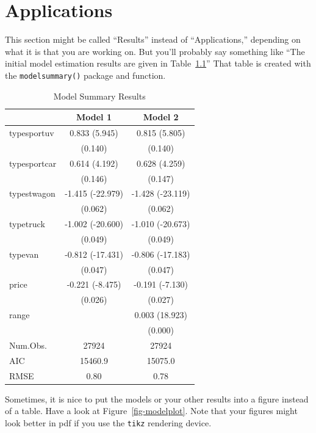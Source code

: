 \documentclass[
  letterpaper,
  DIV=11,
  numbers=noendperiod]{scrreprt}
\begin{document}

\hypertarget{applications}{%
\chapter{Applications}\label{applications}}

This section might be called ``Results'' instead of ``Applications,''
depending on what it is that you are working on. But you'll probably say
something like ``The initial model estimation results are given in
Table~\ref{tbl-estimationresults}'' That table is created with the
\texttt{modelsummary()} package and function.

\hypertarget{tbl-estimationresults}{}
\begin{table}
\caption{\label{tbl-estimationresults}Model Summary Results }\tabularnewline

\centering
\begin{tabular}[t]{lcc}
\toprule
  & Model 1 & Model 2\\
\midrule
typesportuv & 0.833 (5.945) & 0.815 (5.805)\\
 & (0.140) & (0.140)\\
typesportcar & 0.614 (4.192) & 0.628 (4.259)\\
 & (0.146) & (0.147)\\
typestwagon & -1.415 (-22.979) & -1.428 (-23.119)\\
 & (0.062) & (0.062)\\
typetruck & -1.002 (-20.600) & -1.010 (-20.673)\\
 & (0.049) & (0.049)\\
typevan & -0.812 (-17.431) & -0.806 (-17.183)\\
 & (0.047) & (0.047)\\
price & -0.221 (-8.475) & -0.191 (-7.130)\\
 & (0.026) & (0.027)\\
range &  & 0.003 (18.923)\\
 &  & (0.000)\\
\midrule
Num.Obs. & 27924 & 27924\\
AIC & 15460.9 & 15075.0\\
RMSE & 0.80 & 0.78\\
\bottomrule
\end{tabular}
\end{table}

Sometimes, it is nice to put the models or your other results into a
figure instead of a table. Have a look at Figure~\ref{fig-modelplot}.
Note that your figures might look better in pdf if you use the
\texttt{tikz} rendering device.
\end{document}
